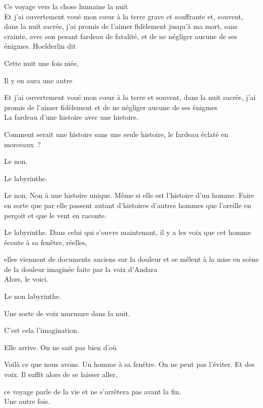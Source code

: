\pagebreak

\clearpage
\thispagestyle{empty}
\movetooddpage

Ce voyage vers la chose humaine la nuit\\

Et j'ai ouvertement voué mon cœur à la terre grave et souffrante et,
souvent, dans la nuit sacrée, j'ai promis de l'aimer fidèlement jusqu'à
ma mort, sans crainte, avec son pesant fardeau de fatalité, et de ne
négliger aucune de ses énigmes. Hoelderlin dit

Cette nuit une fois niée,

Il y en aura une autre

Et j'ai ouvertement voué mon cœur à la terre et souvent, dans la nuit
sacrée, j'ai promis de l'aimer fidèlement et de ne négliger aucune de
ses énigmes\\

La fardeau d'une histoire avec une histoire.

Comment serait une histoire sans une seule histoire, le fardeau éclaté
en morceaux~?

Le non.

Le labyrinthe.

Le non. Non à une histoire unique. Même si elle est l'histoire d'un
homme. Faire en sorte que par elle passent autant d'histoires d'autres
hommes que l'oreille en perçoit et que le vent en raconte.

Le labyrinthe. Dans celui qui s'ouvre maintenant, il y a les voix que
cet homme écoute à sa fenêtre, réelles,

elles viennent de documents anciens sur la douleur et se mêlent à la
mise en scène de la douleur imaginée faite par la voix d'Andara\\

Alors, le voici.

Le non labyrinthe.

\pagebreak

Une sorte de voix murmure dans la nuit.

C'est cela l'imagination.

Elle arrive. On ne sait pas bien d'où

Voilà ce que nous avons. Un homme à sa fenêtre. On ne peut pas l'éviter.
Et des voix. Il suffit alors de se laisser aller,

ce voyage parle de la vie et ne s'arrêtera pas avant la fin.\\

Une autre fois.

